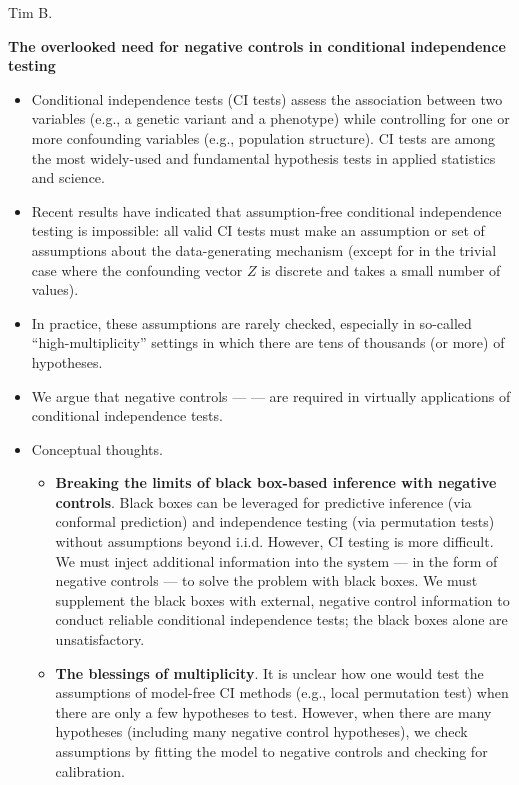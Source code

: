 \documentclass[12pt]{article}
\begin{document}
\noindent
Tim B.
\begin{center}
\textbf{The overlooked need for negative controls in conditional independence testing}
\end{center}

\begin{itemize}
\item Conditional independence tests (CI tests) assess the association between two variables (e.g., a genetic variant and a phenotype) while controlling for one or more confounding variables (e.g., population structure). CI tests are among the most widely-used and fundamental hypothesis tests in applied statistics and science.
\item Recent results have indicated that assumption-free conditional independence testing is impossible: all valid CI tests must make an assumption or set of assumptions about the data-generating mechanism (except for in the trivial case where the confounding vector $Z$ is discrete and takes a small number of values).
\item In practice, these assumptions are rarely checked, especially in so-called ``high-multiplicity'' settings in which there are tens of thousands (or more) of hypotheses.

\item We argue that negative controls ---   --- are required in virtually applications of conditional independence tests.

\item Conceptual thoughts.
\begin{itemize}
\item \textbf{Breaking the limits of black box-based inference with negative controls}. Black boxes can be leveraged for predictive inference (via conformal prediction) and independence testing (via permutation tests) without assumptions beyond i.i.d. However, CI testing is more difficult. We must inject additional information into the system --- in the form of negative controls --- to solve the problem with black boxes. We must supplement the black boxes with external, negative control information to conduct reliable conditional independence tests; the black boxes alone are unsatisfactory.

\item \textbf{The blessings of multiplicity}. It is unclear how one would test the assumptions of model-free CI methods (e.g., local permutation test) when there are only a few hypotheses to test. However, when there are many hypotheses (including many negative control hypotheses), we check assumptions by fitting the model to negative controls and checking for calibration.
\end{itemize}


\end{itemize}
\end{document}
